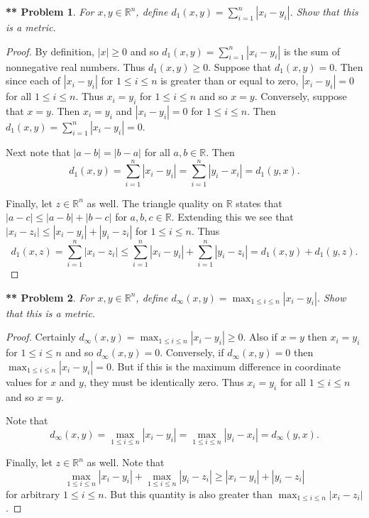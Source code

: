 \documentclass{article}
\newtheorem{**}{** Problem}
\begin{document}
\begin{flushleft}
\begin{**}
For $x,y \in \mathbb{R}^n$, define $d_1(x, y) = \sum_{i=1}^{n} |x_i-y_i|$. Show that this is a metric.
\end{**}
\begin{proof}
By definition, $|x| \geq 0$ and so $d_1(x, y) = \sum_{i=1}^{n} |x_i-y_i|$ is the sum of nonnegative real numbers. Thus $d_1(x, y) \geq 0$. Suppose that $d_1(x, y) = 0$. Then since each of $|x_i-y_i|$ for $1 \leq i \leq n$ is greater than or equal to zero, $|x_i-y_i| = 0$ for all $1 \leq i \leq n$. Thus $x_i = y_i$ for $1 \leq i \leq n$ and so $x = y$. Conversely, suppose that $x = y$. Then $x_i = y_i$ and $|x_i-y_i| = 0$ for $1 \leq i \leq n$. Then $d_1(x, y) = \sum_{i=1}^{n} |x_i-y_i| = 0$.\newline

Next note that $|a-b|=|b-a|$ for all $a,b \in \mathbb{R}$. Then
\[
d_1(x, y) = \sum_{i=1}^{n} |x_i-y_i| = \sum_{i=1}^{n} |y_i-x_i| = d_1(y, x).
\]\newline

Finally, let $z \in \mathbb{R}^n$ as well. The triangle quality on $\mathbb{R}$ states that $|a - c| \leq |a-b| + |b-c|$ for $a,b,c \in \mathbb{R}$. Extending this we see that $|x_i-z_i| \leq |x_i-y_i| + |y_i-z_i|$ for $1 \leq i \leq n$. Thus
\[
d_1(x, z) = \sum_{i=1}^{n} |x_i-z_i| \leq \sum_{i=1}^{n} |x_i-y_i| + \sum_{i=1}^{n} |y_i-z_i| = d_1(x, y) + d_1(y, z).
\]
\end{proof}

\begin{**}
For $x,y \in \mathbb{R}^n$, define $d_{\infty} (x, y) = \max_{1 \leq i \leq n} |x_i-y_i|$. Show that this is a metric.
\end{**}
\begin{proof}
Certainly $d_{\infty} (x, y) = \max_{1 \leq i \leq n} |x_i-y_i| \geq 0$. Also if $x = y$ then $x_i = y_i$ for $1 \leq i \leq n$ and so $d_{\infty} (x, y) = 0$. Conversely, if $d_{\infty} (x, y) = 0$ then $\max_{1 \leq i \leq n} |x_i-y_i| = 0$. But if this is the maximum difference in coordinate values for $x$ and $y$, they must be identically zero. Thus $x_i = y_i$ for all $1 \leq i \leq n$ and so $x = y$.\newline

Note that
\[
d_{\infty} (x, y) = \max_{1 \leq i \leq n} |x_i-y_i| = \max_{1 \leq i \leq n} |y_i-x_i| = d_{\infty} (y, x).
\]\newline

Finally, let $z \in \mathbb{R}^n$ as well. Note that
\[
\max_{1 \leq i \leq n} |x_i-y_i| + \max_{1 \leq i \leq n} |y_i-z_i| \geq |x_i-y_i| + |y_i-z_i|
\]
for arbitrary $1 \leq i \leq n$. But this quantity is also greater than $\max_{1 \leq i \leq n} |x_i-z_i|$.
\end{proof}


\end{flushleft}
\end{document}
